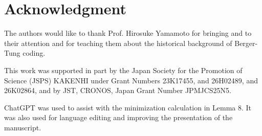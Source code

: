 \documentclass[journal,onecolumn]{IEEEtran}
\theoremstyle{definition}
\theoremstyle{remark}
\begin{document}
\section*{Acknowledgment}
The authors would like to thank Prof. Hirosuke Yamamoto for bringing \cite{yamamoto:82,BergerHousewright:79,Housewright:77} and \cite{YamamotoItoh:1980} to their attention 
and for teaching them about the historical background of Berger-Tung coding.

This work was supported in part by the Japan Society for the Promotion of Science (JSPS) KAKENHI under Grant Numbers
23K17455, and 26H02489, and 26K02864, and by JST, CRONOS, Japan Grant Number JPMJCS25N5.

ChatGPT was used to assist with the minimization calculation in Lemma 8. It was also used for language editing and improving the presentation of the manuscript.




    
\end{document}
